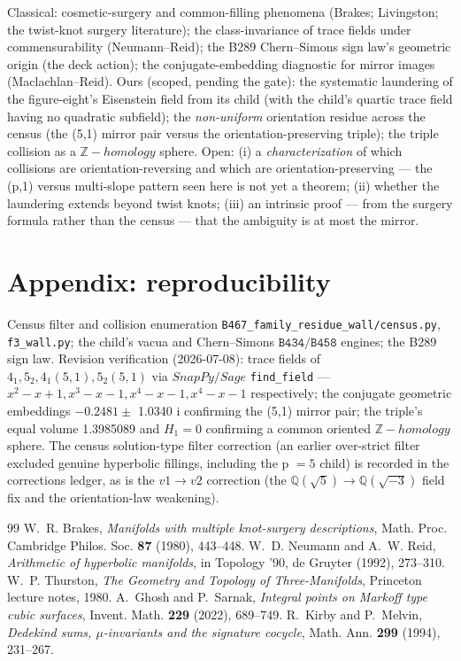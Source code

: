 \documentclass[11pt]{article}
\theoremstyle{plain}
\theoremstyle{definition}
\theoremstyle{remark}
\begin{document}
Classical: cosmetic-surgery and common-filling phenomena (Brakes; Livingston; the twist-knot surgery literature); the class-invariance of trace fields under commensurability (Neumann–Reid); the B289 Chern–Simons sign law's geometric origin (the deck action); the conjugate-embedding diagnostic for mirror images (Maclachlan–Reid). Ours (scoped, pending the gate): the systematic laundering of the figure-eight's Eisenstein field from its child (with the child's quartic trace field having no quadratic subfield); the \emph{non-uniform} orientation residue across the census (the (5,1) mirror pair versus the orientation-preserving triple); the triple collision as a \(\mathbb{Z}-homology\) sphere. Open: (i) a \emph{characterization} of which collisions are orientation-reversing and which are orientation-preserving — the (p,1) versus multi-slope pattern seen here is not yet a theorem; (ii) whether the laundering extends beyond twist knots; (iii) an intrinsic proof — from the surgery formula rather than the census — that the ambiguity is at most the mirror.

\section{Appendix: reproducibility}

Census filter and collision enumeration \texttt{B467\_family\_residue\_wall/census.py}, \texttt{f3\_wall.py}; the child's vacua and Chern–Simons \(\texttt{B434}/\texttt{B458}\) engines; the B289 sign law. Revision verification (2026-07-08): trace fields of \(4_{1}, 5_{2}, 4_{1}(5,1), 5_{2}(5,1)\) via \(SnapPy/Sage\) \texttt{find\_field} — \(x^{2}-x+1, x^{3}-x-1, x^{4}-x-1, x^{4}-x-1\) respectively; the conjugate geometric embeddings \(-0.2481 \pm \) 1.0340 i confirming the (5,1) mirror pair; the triple's equal volume 1.3985089 and \(H_{1} = 0\) confirming a common oriented \(\mathbb{Z}-homology\) sphere. The census solution-type filter correction (an earlier over-strict filter excluded genuine hyperbolic fillings, including the p \(= 5\) child) is recorded in the corrections ledger, as is the \(v1\to v2\) correction (the \(\mathbb{Q}(\sqrt{5})\to \mathbb{Q}(\sqrt{-3})\) field fix and the orientation-law weakening).

\begin{thebibliography}{99}
 W.~R. Brakes, \emph{Manifolds with multiple knot-surgery descriptions}, Math. Proc. Cambridge Philos. Soc. \textbf{87} (1980), 443--448.
 W.~D. Neumann and A.~W. Reid, \emph{Arithmetic of hyperbolic manifolds}, in Topology '90, de Gruyter (1992), 273--310.
 W.~P. Thurston, \emph{The Geometry and Topology of Three-Manifolds}, Princeton lecture notes, 1980.
 A.~Ghosh and P.~Sarnak, \emph{Integral points on Markoff type cubic surfaces}, Invent. Math. \textbf{229} (2022), 689--749.
 R.~Kirby and P.~Melvin, \emph{Dedekind sums, $\mu$-invariants and the signature cocycle}, Math. Ann. \textbf{299} (1994), 231--267.
\end{thebibliography}
\end{document}
